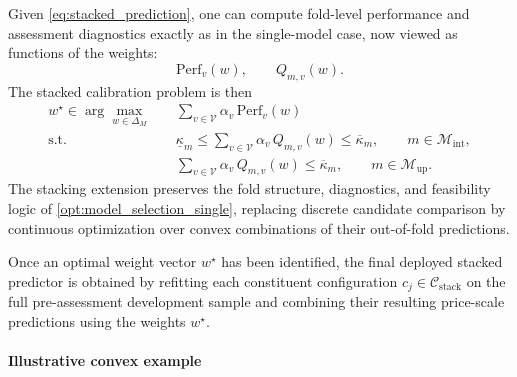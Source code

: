 \documentclass[12pt]{article}
\theoremstyle{plain}
\theoremstyle{definition}
\newcommand{\1}{\mathbf{1}}
\begin{document}
Given \eqref{eq:stacked_prediction}, one can compute fold-level performance and assessment diagnostics exactly as in the single-model case, now viewed as functions of the weights:
\[
\mathrm{Perf}_v(w),
\qquad
Q_{m,v}(w).
\]
The stacked calibration problem is then
\begin{align}
    \label{opt:model_selection_stacking}
    w^\star
    \in
    \arg\max_{w\in\Delta_M}
    \quad
    & \sum_{v\in\mathcal V}\alpha_v\,\mathrm{Perf}_v(w)
    \\
    \text{s.t.}\quad
    & \underline{\kappa}_m
      \le
      \sum_{v\in\mathcal V}\alpha_v\,Q_{m,v}(w)
      \le
      \overline{\kappa}_m,
      \qquad
      m\in\mathcal M_{\mathrm{int}},
      \nonumber\\
    & \sum_{v\in\mathcal V}\alpha_v\,Q_{m,v}(w)
      \le
      \overline{\kappa}_m,
      \qquad
      m\in\mathcal M_{\mathrm{up}}.
      \nonumber
\end{align}
The stacking extension preserves the fold structure, diagnostics, and feasibility logic of \eqref{opt:model_selection_single}, replacing discrete candidate comparison by continuous optimization over convex combinations of their out-of-fold predictions.

Once an optimal weight vector $w^\star$ has been identified, the final deployed stacked predictor is obtained by refitting each constituent configuration $c_j\in\mathcal C_{\mathrm{stack}}$ on the full pre-assessment development sample and combining their resulting price-scale predictions using the weights $w^\star$.

\paragraph{Illustrative convex example}
\label{subsubsec:convex_example}
\end{document}
